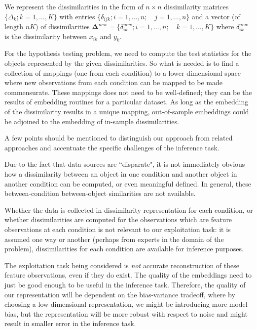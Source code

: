 \documentclass[12pt,oneside,final]{thesis}\usepackage[]{graphicx}\usepackage[]{color}
\begin{document}
We represent the dissimilarities in the form  of $n \times n$  dissimilarity matrices $\{\Delta_k;k=1,\ldots,K\}$ with entries $\{\delta_{ijk} ;  i=1,\ldots,n;\quad j=1,\ldots,n\}$  and a  vector (of length $nK$) of dissimilarities  $\mathbf{\Delta}^{new}=\{ \delta_{ik}^{new}; i=1,\ldots, n;\quad k=1,\ldots,K\}  $  where $\delta_{ik}^{new} $ is the dissimilarity  between  $x_{ik}$ and $y_k$.
 
 
For the hypothesis testing problem, we need to compute the test statistics for the objects represented by the given dissimilarities. So what is needed is to find a collection of mappings (one from each condition) to a lower dimensional space where new observations from each condition can be mapped to be made commensurate. These mappings does not need to be  well-defined; they can be the results of embedding routines for a particular dataset. As long as the embedding of the dissimilarity results in a  unique mapping,  out-of-sample embeddings could be adjoined to the embedding of in-sample dissimilarities.

A few points should be mentioned to distinguish our approach from related approaches and accentuate the specific challenges of the inference task.
\begin{remark}
Due to the fact that data sources are ``disparate", it is not immediately obvious how  a dissimilarity between an object in one condition and another object in another condition  can be computed, or even meaningful defined.  In general, these between-condition between-object  similarities are not available.
\label{rem:between_cond_diss}
\end{remark}
 
 \begin{remark}
 Whether the data is collected in dissimilarity representation for each condition, or whether dissimilarities are computed for the observations which are feature observations at each condition is not relevant to our exploitation task: it is assumed one way or another (perhaps from experts in the domain of the problem),  dissimilarities for each condition are available for inference purposes. 
\end{remark}

\begin{remark}
The exploitation task  being considered is \emph{not} accurate reconstruction of these feature observations, even if they do exist. The quality of the  embeddings need to just be  good enough to be useful in the inference task. Therefore, the quality of our representation will be dependent on the bias-variance tradeoff, where by choosing a low-dimensional representation, we might be introducing more model bias, but the representation will be more  robust with respect to noise and might result in smaller error in the inference task.
\end{remark}
\end{document}
